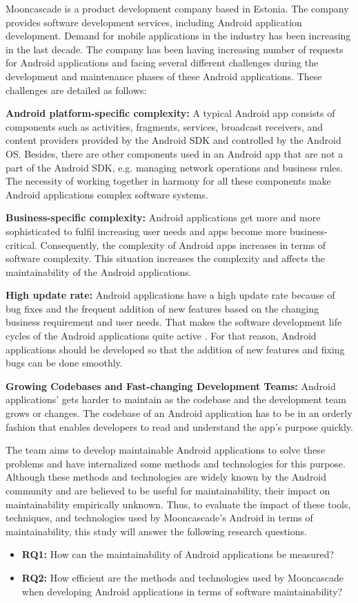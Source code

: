 Mooncascade is a product development company based in Estonia. The company provides software development services, including Android application development. Demand for mobile applications in the industry has been increasing in the last decade. The company has been having increasing number of requests for Android applications and facing several different challenges during the development and maintenance phases of these Android applications. These challenges are detailed as follows:

\noindent\textbf{Android platform-specific complexity:} A typical Android app consists of components such as activities, fragments, services, broadcast receivers, and content providers provided by the Android SDK and controlled by the Android OS. Besides, there are other components used in an Android app that are not a part of the Android SDK, e.g. managing network operations and business rules. The necessity of working together in harmony for all these components make Android applications complex software systems.

\noindent\textbf{Business-specific complexity:} Android applications get more and more sophisticated to fulfil increasing user needs and apps become more business-critical. Consequently, the complexity of Android apps increases in terms of software complexity\cite{2}. This situation increases the complexity and affects the maintainability of the Android applications.

\noindent\textbf{High update rate:} Android applications have a high update rate because of bug fixes and the frequent addition of new features based on the changing business requirement and user needs. That makes the software development life cycles of the Android applications quite active \cite{3}. For that reason, Android applications should be developed so that the addition of new features and fixing bugs can be done smoothly.

\noindent\textbf{Growing Codebases and Fast-changing Development Teams:} Android applications' gets harder to maintain as the codebase and the development team grows or changes. The codebase of an Android application has to be in an orderly fashion that enables developers to read and understand the app's purpose quickly.

The team aims to develop maintainable Android applications to solve these problems and have internalized some methods and technologies for this purpose. Although these methods and technologies are widely known by the Android community and are believed to be useful for maintainability, their impact on maintainability empirically unknown. Thus, to evaluate the impact of these tools, techniques, and technologies used by Mooncascade's Android in terms of maintainability, this study will answer the following research questions. 

\begin{itemize}
\item \noindent\textbf{RQ1:} How can the maintainability of Android applications be measured?
\item \noindent\textbf{RQ2:} How efficient are the methods and technologies used by Mooncascade when developing Android applications in terms of software maintainability?
\end{itemize}